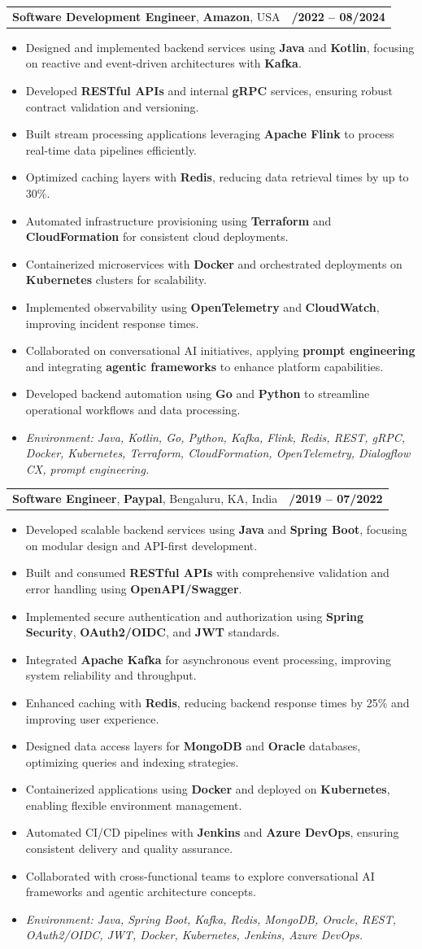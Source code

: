 \documentclass[letterpaper,11pt]{article}
\makeatletter
\newcommand{\resumeItem}[1]{
  \item\footnotesize{
    {#1 \vspace{-2pt}}
  }
}
\newcommand{\resumeSubheading}[4]{
  \vspace{-2pt}\item
    \begin{tabular*}{1.0\textwidth}[t]{l@{\extracolsep{\fill}}r}
      \textbf{\fontsize{10pt}{14pt}\selectfont #3}, \textbf{\fontsize{10pt}{14pt}\selectfont #1}, \fontsize{10pt}{14pt}\selectfont #4 & \textbf{\fontsize{10pt}{14pt}\selectfont #2} \\
    \end{tabular*}\vspace{-7pt}
}
\newcommand{\resumeItemListStart}{\begin{itemize}[leftmargin=*]}
\newcommand{\resumeItemListEnd}{\end{itemize}\vspace{-5pt}}
\makeatother
\begin{document}
\resumeSubheading
{Amazon}{10/2022 -- 08/2024}
{Software Development Engineer}{USA}
\resumeItemListStart
  \resumeItem{Designed and implemented backend services using \textbf{Java} and \textbf{Kotlin}, focusing on reactive and event-driven architectures with \textbf{Kafka}.}
  \resumeItem{Developed \textbf{RESTful APIs} and internal \textbf{gRPC} services, ensuring robust contract validation and versioning.}
  \resumeItem{Built stream processing applications leveraging \textbf{Apache Flink} to process real-time data pipelines efficiently.}
  \resumeItem{Optimized caching layers with \textbf{Redis}, reducing data retrieval times by up to 30\%.}
  \resumeItem{Automated infrastructure provisioning using \textbf{Terraform} and \textbf{CloudFormation} for consistent cloud deployments.}
  \resumeItem{Containerized microservices with \textbf{Docker} and orchestrated deployments on \textbf{Kubernetes} clusters for scalability.}
  \resumeItem{Implemented observability using \textbf{OpenTelemetry} and \textbf{CloudWatch}, improving incident response times.}
  \resumeItem{Collaborated on conversational AI initiatives, applying \textbf{prompt engineering} and integrating \textbf{agentic frameworks} to enhance platform capabilities.}
  \resumeItem{Developed backend automation using \textbf{Go} and \textbf{Python} to streamline operational workflows and data processing.}
  \resumeItem{\textit{Environment: Java, Kotlin, Go, Python, Kafka, Flink, Redis, REST, gRPC, Docker, Kubernetes, Terraform, CloudFormation, OpenTelemetry, Dialogflow CX, prompt engineering.}}
\resumeItemListEnd

\resumeSubheading
{Paypal}{08/2019 -- 07/2022}
{Software Engineer}{Bengaluru, KA, India}
\resumeItemListStart
  \resumeItem{Developed scalable backend services using \textbf{Java} and \textbf{Spring Boot}, focusing on modular design and API-first development.}
  \resumeItem{Built and consumed \textbf{RESTful APIs} with comprehensive validation and error handling using \textbf{OpenAPI/Swagger}.}
  \resumeItem{Implemented secure authentication and authorization using \textbf{Spring Security}, \textbf{OAuth2/OIDC}, and \textbf{JWT} standards.}
  \resumeItem{Integrated \textbf{Apache Kafka} for asynchronous event processing, improving system reliability and throughput.}
  \resumeItem{Enhanced caching with \textbf{Redis}, reducing backend response times by 25\% and improving user experience.}
  \resumeItem{Designed data access layers for \textbf{MongoDB} and \textbf{Oracle} databases, optimizing queries and indexing strategies.}
  \resumeItem{Containerized applications using \textbf{Docker} and deployed on \textbf{Kubernetes}, enabling flexible environment management.}
  \resumeItem{Automated CI/CD pipelines with \textbf{Jenkins} and \textbf{Azure DevOps}, ensuring consistent delivery and quality assurance.}
  \resumeItem{Collaborated with cross-functional teams to explore conversational AI frameworks and agentic architecture concepts.}
  \resumeItem{\textit{Environment: Java, Spring Boot, Kafka, Redis, MongoDB, Oracle, REST, OAuth2/OIDC, JWT, Docker, Kubernetes, Jenkins, Azure DevOps.}}
\resumeItemListEnd
\end{document}
